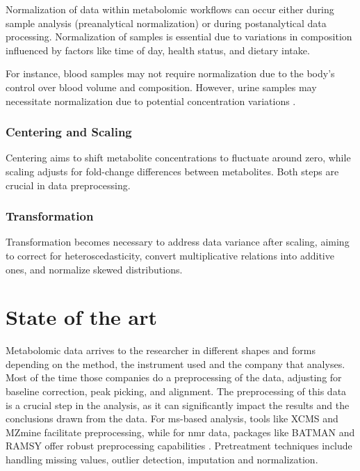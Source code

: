 \documentclass[ENG, BIB]{TFUOC}%
\begin{document}
Normalization of data within metabolomic workflows can occur either during sample analysis (preanalytical normalization) or during postanalytical data processing. Normalization of samples is essential due to variations in composition influenced by factors like time of day, health status, and dietary intake.

For instance, blood samples may not require normalization due to the body's control over blood volume and composition. However, urine samples may necessitate normalization due to potential concentration variations \cite{ulaszewskaNutrimetabolomicsIntegrativeAction2019a}.


\subsubsection{Centering and Scaling}

Centering aims to shift metabolite concentrations to fluctuate around zero, while scaling adjusts for fold-change differences between metabolites. Both steps are crucial in data preprocessing.

\subsubsection[Transf]{Transformation}

Transformation becomes necessary to address data variance after scaling, aiming to correct for heteroscedasticity, convert multiplicative relations into additive ones, and normalize skewed distributions.

\section{State of the art}


Metabolomic data arrives to the researcher in different shapes and forms depending on the method, the instrument used and the company that analyses. Most of the time those companies do a preprocessing of the data, adjusting for baseline correction, peak picking, and alignment. The preprocessing of this data is a crucial step in the analysis, as it can significantly impact the results and the conclusions drawn from the data.
For \gls{ms}-based analysis, tools like XCMS \cite{R-xcms} and MZmine \cite{schmidIntegrativeAnalysisMultimodal2023} facilitate preprocessing, while for \gls{nmr} data, packages like BATMAN \cite{R-batman} and RAMSY \cite{guRAMSYRatioAnalysis2013} offer robust preprocessing capabilities . Pretreatment techniques include handling missing values, outlier detection, imputation and normalization.
\end{document}
